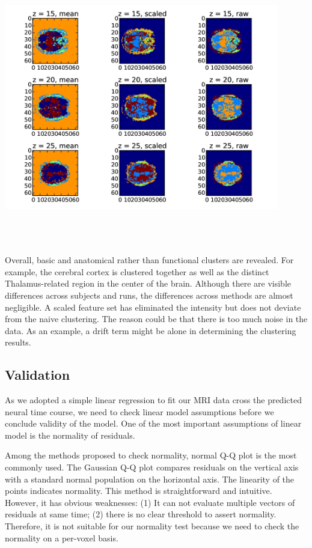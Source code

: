 \documentclass[11pt]{article}
\begin{document}
\centering
\includegraphics[width=12cm, height=12cm]{subject_across_methods.jpg}

Overall, basic and anatomical rather than functional clusters are revealed. For
example, the cerebral cortex is clustered together as well as the distinct
Thalamus-related region in the center of the brain.  Although there are visible
differences across subjects and runs, the differences across methods are almost
negligible. A scaled feature set has eliminated the intensity but does not
deviate from the naive clustering. The reason could be that there is too much
noise in the data. As an example, a drift term might be alone in determining 
the
clustering results. 

\subsection{Validation}

As we adopted a simple linear regression to fit our MRI data cross the 
predicted
neural time course, we need to check linear model assumptions before we 
conclude
validity of the model. One of the most important assumptions of linear model is
the normality of residuals.

Among the methods proposed to check normality, normal Q-Q plot is the most
commonly used. The Gaussian Q-Q plot compares residuals on the vertical axis
with a standard normal population on the horizontal axis. The linearity of the
points indicates normality. This method is straightforward and
intuitive. However, it has obvious weaknesses: (1) It can not evaluate multiple
vectors of residuals at same time; (2) there is no clear threshold to assert
normality. Therefore, it is not suitable for our normality test because we need
to check the normality on a per-voxel basis.
\end{document}
